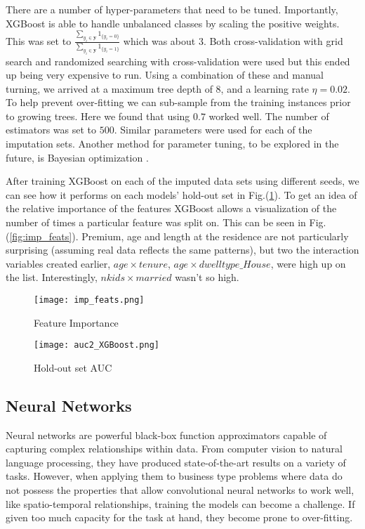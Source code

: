\documentclass[11pt]{article}
\theoremstyle{remark}
\theoremstyle{definition}
\begin{document}
There are a number of hyper-parameters that need to be tuned. Importantly, XGBoost is able to handle unbalanced classes by scaling the positive weights. This was set to $\frac{\sum_{y_i \in \mathbf{y}} 1_{\{y_i = 0\}}}{\sum_{y_i \in \mathbf{y}} 1_{\{y_i = 1\}}}$ which was about $3$. Both cross-validation with grid search and randomized searching with cross-validation were used but this ended up being very expensive to run. Using a combination of these and manual turning, we arrived at a maximum tree depth of 8, and a learning rate $\eta=0.02$. To help prevent over-fitting we can sub-sample from the training instances prior to growing trees. Here we found that using $0.7$ worked well. The number of estimators was set to $500$. Similar parameters were used for each of the imputation sets. Another method for parameter tuning, to be explored in the future, is Bayesian optimization \citep{snoek2012}. 

After training XGBoost on each of the imputed data sets using different seeds, we can see how it performs on each models' hold-out set in Fig.(\ref{fig:auc}). To get an idea of the relative importance of the features XGBoost allows a visualization of the number of times a particular feature was split on. This can be seen in Fig.(\ref{fig:imp_feats}). Premium, age and length at the residence are not particularly surprising (assuming real data reflects the same patterns), but two the interaction variables created earlier, $age \times tenure$, $age \times dwelltype\_House$, were high up on the list. Interestingly, $nkids \times married$ wasn't so high.
\begin{figure}[H]
    \centering
    \begin{minipage}{.5\linewidth}
        \centering
        \texttt{[image: imp\_feats.png]}
        \caption{Feature Importance}
        \label{fig:imp_feats}
    \end{minipage}%
    \begin{minipage}{0.5\linewidth}
        \centering
        \texttt{[image: auc2\_XGBoost.png]}
        \caption{Hold-out set AUC}
        \label{fig:auc}
    \end{minipage}
\end{figure}
\subsection{Neural Networks}
Neural networks \citep{goodfellow2016} are powerful black-box function approximators capable of capturing complex relationships within data. From computer vision to natural language processing, they have produced state-of-the-art results on a variety of tasks. However, when applying them to business type problems where data do not possess the properties that allow convolutional neural networks to work well, like spatio-temporal relationships, training the models can become a challenge. If given too much capacity for the task at hand, they become prone to over-fitting. 
\end{document}
